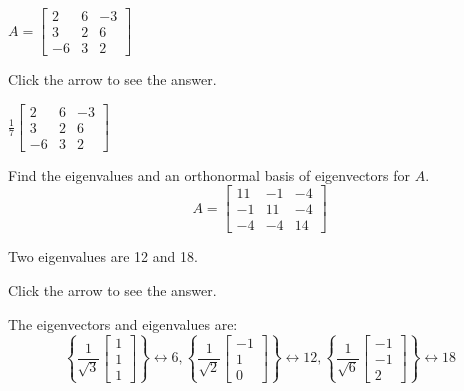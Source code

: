 \documentclass{ximera}
\begin{document}
\begin{problem}
\begin{problem}\label{prob:make_ortho_matrix8}
$A = \begin{bmatrix}
2 & 6 & -3 \\
3 & 2 & 6 \\
-6 & 3 & 2
\end{bmatrix}$

Click the arrow to see the answer.
\begin{expandable}
$\frac{1}{7}\begin{bmatrix}
2 & 6 & -3 \\
3 & 2 & 6 \\
-6 & 3 & 2
\end{bmatrix}$
\end{expandable}
\end{problem}

\end{problem}


 \begin{problem}\label{prb:9.1} Find the eigenvalues and an orthonormal basis of eigenvectors for $A.$
\begin{equation*}
A=\left[
\begin{array}{rrr}
11 & -1 & -4 \\
-1 & 11 & -4 \\
-4 & -4 & 14
\end{array}
\right]
\end{equation*}

\begin{hint} 
Two eigenvalues are 12 and 18.

Click the arrow to see the answer. \begin{expandable}
The eigenvectors and eigenvalues are:
\[
\left\{ \frac{1}{\sqrt{3}}\left[
\begin{array}{c}
1 \\
1 \\
1
\end{array}
\right] \right\} \leftrightarrow 6,\left\{ \frac{1}{\sqrt{2}}\left[
\begin{array}{r}
-1 \\
1 \\
0
\end{array}
\right] \right\} \leftrightarrow 12,\left\{ \frac{1}{\sqrt{6}}\left[
\begin{array}{r}
-1 \\
-1 \\
2
\end{array}
\right] \right\} \leftrightarrow 18
\]
\end{expandable} \end{hint}
\end{problem}
\end{document}
